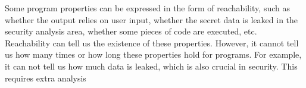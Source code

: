  
Some program properties can be expressed in the form of reachability,
such as
whether the output relies on user input, whether the secret data is leaked in the security analysis area, 
whether some pieces of code are executed, etc.
Reachability can tell us the existence of these properties.
However, it cannot tell us how many times or how long these properties hold for programs.
For example, it can not tell us how much data is leaked, which is also crucial in security. This requires extra analysis
